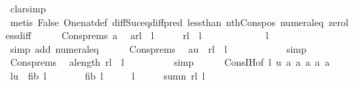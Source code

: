 \begin{isabellebody}
\ {\isacharparenleft}clarsimp{\isacharparenright}\isanewline
\ \ \ \ \ \ \isamarkupfalse%
\ {\isacharparenleft}metis\ False\ One{\isacharunderscore}nat{\isacharunderscore}def\ diff{\isacharunderscore}Suc{\isacharunderscore}eq{\isacharunderscore}diff{\isacharunderscore}pred\ less{\isacharunderscore}than\ nth{\isacharunderscore}Cons{\isacharunderscore}pos\ numeral{\isacharunderscore}{}{\isacharunderscore}eq{\isacharunderscore}{}\ zero{\isacharunderscore}less{\isacharunderscore}diff{\isacharparenright}\isanewline
\ \ \ \ \isamarkupfalse%
\ Cons{\isachardot}prems\ a{}\ \isamarkupfalse%
\ a{}{\isacharcolon}{\isachardoublequoteopen}rl\ {\isacharbang}\ {\isacharparenleft}l\ {\isacharminus}\ {}\ {\isacharminus}\ {}{\isacharparenright}\ {\isacharless}\ rl\ {\isacharbang}\ {\isacharparenleft}l\ {\isacharminus}\ {}\ {\isacharminus}\ {}{\isacharparenright}{\isachardoublequoteclose}\ \isanewline
\ \ \ \ \ \ \isamarkupfalse%
\ l{}\ \isamarkupfalse%
\ {\isacharparenleft}simp\ add{\isacharcolon}\ numeral{\isacharunderscore}{}{\isacharunderscore}eq{\isacharunderscore}{}{\isacharparenright}\isanewline
\ \ \ \ \isamarkupfalse%
\ Cons{\isachardot}prems\ \isamarkupfalse%
\ a{}{\isacharcolon}{\isachardoublequoteopen}u\ {\isasymle}\ rl\ {\isacharbang}\ {\isacharparenleft}l\ {\isacharminus}\ {}\ {\isacharminus}\ {}{\isacharparenright}{\isachardoublequoteclose}\isanewline
\ \ \ \ \ \ \isamarkupfalse%
\ {\isacharparenleft}simp{\isacharparenright}\isanewline
\ \ \ \ \isamarkupfalse%
\ Cons{\isachardot}prems\ \isamarkupfalse%
\ a{}{\isacharcolon}{\isachardoublequoteopen}length\ rl\ {\isacharequal}\ l\ {\isacharminus}\ {}{\isachardoublequoteclose}\isanewline
\ \ \ \ \ \ \isamarkupfalse%
\ {\isacharparenleft}simp{\isacharparenright}\isanewline
\ \ \ \ \isamarkupfalse%
\ Cons{\isachardot}IH{\isacharbrackleft}of\ {\isachardoublequoteopen}l{\isacharminus}{}{\isachardoublequoteclose}\ u{\isacharbrackright}\ a{}\ a{}\ a{}\ a{}\ a{}\ \isamarkupfalse%
\ l{}{\isacharcolon}{\isachardoublequoteopen}u\ {\isacharasterisk}\ {\isacharparenleft}fib\ {\isacharparenleft}l\ {\isacharminus}\ {}\ {\isacharplus}\ {}{\isacharparenright}\ {\isacharminus}\ {}{\isacharparenright}\ {\isacharplus}\ {\isacharparenleft}fib{}\ {\isacharparenleft}l\ {\isacharminus}\ {}\ {\isacharplus}\ {}{\isacharparenright}\ {\isacharminus}\ {\isacharparenleft}l\ {\isacharminus}\ {}\ {\isacharplus}\ {}{\isacharparenright}{\isacharparenright}\ {\isasymle}\ sumn\ rl\ {\isacharparenleft}l\ {\isacharminus}\ {}{\isacharparenright}{\isachardoublequoteclose}\isanewline

\end{isabellebody}
